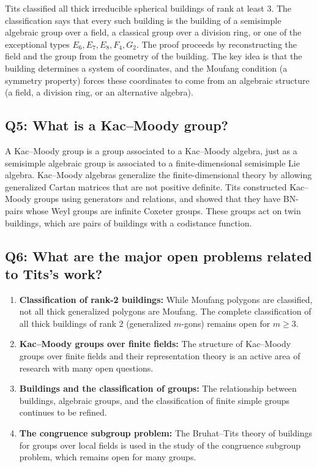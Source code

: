 Tits classified all thick irreducible spherical buildings of rank at least 3. The classification says that every such building is the building of a semisimple algebraic group over a field, a classical group over a division ring, or one of the exceptional types \(E_6, E_7, E_8, F_4, G_2\). The proof proceeds by reconstructing the field and the group from the geometry of the building. The key idea is that the building determines a system of coordinates, and the Moufang condition (a symmetry property) forces these coordinates to come from an algebraic structure (a field, a division ring, or an alternative algebra).

\subsection*{Q5: What is a Kac--Moody group?}

A Kac--Moody group is a group associated to a Kac--Moody algebra, just as a semisimple algebraic group is associated to a finite-dimensional semisimple Lie algebra. Kac--Moody algebras generalize the finite-dimensional theory by allowing generalized Cartan matrices that are not positive definite. Tits constructed Kac--Moody groups using generators and relations, and showed that they have BN-pairs whose Weyl groups are infinite Coxeter groups. These groups act on twin buildings, which are pairs of buildings with a codistance function.

\subsection*{Q6: What are the major open problems related to Tits's work?}

\begin{enumerate}
    \item \textbf{Classification of rank-2 buildings:} While Moufang polygons are classified, not all thick generalized polygons are Moufang. The complete classification of all thick buildings of rank 2 (generalized \(m\)-gons) remains open for \(m \geq 3\).
    \item \textbf{Kac--Moody groups over finite fields:} The structure of Kac--Moody groups over finite fields and their representation theory is an active area of research with many open questions.
    \item \textbf{Buildings and the classification of groups:} The relationship between buildings, algebraic groups, and the classification of finite simple groups continues to be refined.
    \item \textbf{The congruence subgroup problem:} The Bruhat--Tits theory of buildings for groups over local fields is used in the study of the congruence subgroup problem, which remains open for many groups.
\end{enumerate}

